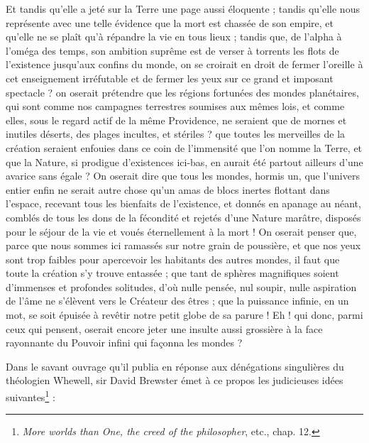 \documentclass[a4paper, 11pt, oneside]{article}
\begin{document}
Et tandis qu'elle a jeté sur la Terre une page aussi éloquente ; tandis qu'elle nous représente avec une telle évidence que la mort est chassée de son empire, et qu'elle ne se plaît qu'à répandre la vie en tous lieux ; tandis que, de l'alpha à l'oméga des temps, son ambition suprême est de verser à torrents les flots de l'existence jusqu'aux confins du monde, on se croirait en droit de fermer l'oreille à cet enseignement irréfutable et de fermer les yeux sur ce grand et imposant spectacle ? on oserait prétendre que les régions fortunées des mondes planétaires, qui sont comme nos campagnes terrestres soumises aux mêmes lois, et comme elles, sous le regard actif de la même Providence, ne seraient que de mornes et inutiles déserts, des plages incultes, et stériles ? que toutes les merveilles de la création seraient enfouies dans ce coin de l'immensité que l'on nomme la Terre, et que la Nature, si prodigue d'existences ici-bas, en aurait été partout ailleurs d'une avarice sans égale ? On oserait dire que tous les mondes, hormis un, que l'univers entier enfin ne serait autre chose qu'un amas de blocs inertes flottant dans l'espace, recevant tous les bienfaits de l'existence, et donnés en apanage au néant, comblés de tous les dons de la fécondité et rejetés d'une Nature marâtre, disposés pour le séjour de la vie et voués éternellement à la mort ! On oserait penser que, parce que nous sommes ici ramassés sur notre grain de poussière, et que nos yeux sont trop faibles pour apercevoir les habitants des autres mondes, il faut que toute la création s'y trouve entassée ; que tant de sphères magnifiques soient d'immenses et profondes solitudes, d'où nulle pensée, nul soupir, nulle aspiration de l'âme ne s'élèvent vers le Créateur des êtres ; que la puissance infinie, en un mot, se soit épuisée à revêtir notre petit globe de sa parure ! Eh ! qui donc, parmi ceux qui pensent, oserait encore jeter une insulte aussi grossière à la face rayonnante du Pouvoir infini qui façonna les mondes ?

Dans le savant ouvrage qu'il publia en réponse aux dénégations singulières du théologien Whewell, sir David Brewster émet à ce propos les judicieuses idées suivantes\footnote{\emph{More worlds than One, the creed of the philosopher}, etc., chap. 12.} :
\end{document}

